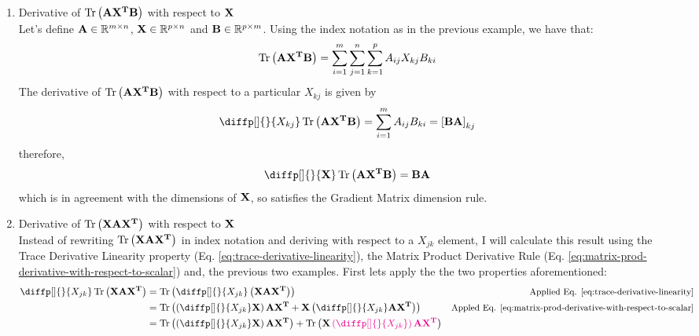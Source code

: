 \documentclass[12pt]{article}
\begin{document}
\begin{enumerate}
    \item Derivative of $\Tr\parentheses{\mat{A X^T B}}$ with respect to $\mat{X}$\\
    Let's define $\mat{A} \in \R^{m\times n}$, $\mat{X} \in \R^{p\times n}$ and $\mat{B} \in \R^{p\times m}$. Using the index notation as in the previous example, we have that:
    \begin{equation*}
        \Tr\parentheses{\mat{A X^T B}} = \Sum{1}{m}\Sum[j]{1}{n}\Sum[k]{1}{p} A_{ij} X_{kj} B_{ki}
    \end{equation*}
    The derivative of $\Tr\parentheses{\mat{AX^TB}}$ with respect to a particular $X_{kj}$ is given by
    \begin{equation}
        \diffp[]{}{X_{kj}} \Tr\parentheses{\mat{AX^TB}} = \Sum{1}{m} A_{ij} B_{ki} = \brac{\mat{B A}}_{kj}
        \label{eq:trace-ax^tb-derivative-with-respect-to-scalar}
    \end{equation}
    therefore,
    \begin{equation}
        \diffp[]{}{\mat{X}} \Tr\parentheses{\mat{AX^TB}} = \mat{B A}
        \label{eq:trace-ax^tb-derivative}
    \end{equation}
    which is in agreement with the dimensions of $\mat{X}$, so satisfies the Gradient Matrix dimension rule.
    \item Derivative of $\Tr\parentheses{\mat{X A X^T}}$ with respect to $\mat{X}$\\
    Instead of rewriting $\Tr\parentheses{\mat{X A X^T}}$ in index notation and deriving with respect to a $X_{jk}$ element, I will calculate this result using the Trace Derivative Linearity property (Eq. \ref{eq:trace-derivative-linearity}), the Matrix Product Derivative Rule (Eq. \ref{eq:matrix-prod-derivative-with-respect-to-scalar}) and, the previous two examples.
    First lets apply the the two properties aforementioned:
    \begin{equation*}
        \begin{aligned}
            \diffp[]{}{X_{jk}} \Tr\parentheses{\mat{X A X^T}} &= \Tr\parentheses{\diffp[]{}{X_{jk}} \parentheses{\mat{X A X^T}}} & \text{\small Applied Eq. \ref{eq:trace-derivative-linearity}}\\
            &= \Tr\parentheses{\parentheses{\diffp[]{}{X_{jk}} \mat{X}} \mat{A X^T} + \mat{X}\parentheses{\diffp[]{}{X_{jk}} \mat{A X^T}}} & \text{\small Appled Eq. \ref{eq:matrix-prod-derivative-with-respect-to-scalar}}\\
            &= \Tr\parentheses{\parentheses{\diffp[]{}{X_{jk}} \mat{X}} \mat{A X^T}} + \Tr\parentheses{\mat{X}\magenta{\parentheses{\diffp[]{}{X_{jk}}} \mat{A X^T}}}\\

\end{aligned}
\end{equation*}
\end{enumerate}
\end{document}

